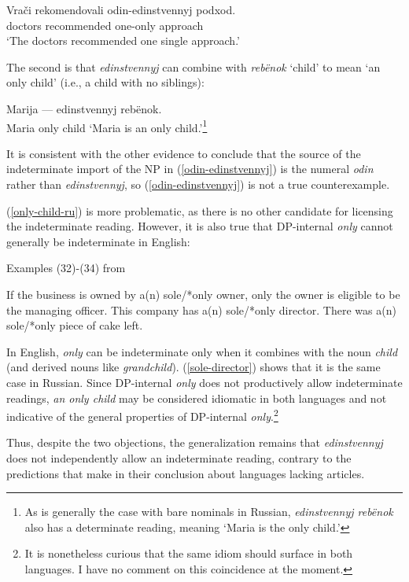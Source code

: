 \begin{exe}
	\ex \label{odin-edinstvennyj} \gll Vra\v{c}i rekomendovali odin-edinstvennyj podxod.\\
	doctors recommended one-only approach\\
	`The doctors recommended one single approach.'
\end{exe}

The second is that \textit{edinstvennyj} can combine with \textit{reb\"{e}nok} `child' to mean `an only child' (i.e., a child with no siblings):

\begin{exe}
	\ex \label{only-child-ru} Marija --- edinstvennyj reb\"{e}nok.\\
	Maria {} only child
	\glt `Maria is an only child.'\footnote{As is generally the case with bare nominals in Russian, \textit{edinstvennyj reb\"{e}nok} also has a determinate reading, meaning `Maria is the only child.'}
\end{exe}

It is consistent with the other evidence to conclude that the source of the indeterminate import of the NP in (\ref{odin-edinstvennyj}) is the numeral \textit{odin} rather than \textit{edinstvennyj}, so (\ref{odin-edinstvennyj}) is not a true counterexample.

(\ref{only-child-ru}) is more problematic, as there is no other candidate for licensing the indeterminate reading. However, it is also true that DP-internal \textit{only} cannot generally be indeterminate in English:


\begin{exe}
	\ex Examples (32)-(34) from \citet{cb2012a} \begin{xlist}
		\ex If the business is owned by a(n) sole/*only owner, only the owner is eligible to be the managing officer.
		\ex This company has a(n) sole/*only director.
		\ex There was a(n) sole/*only piece of cake left.
	\end{xlist}
\end{exe}

In English, \textit{only} can be indeterminate only when it combines with the noun \textit{child} (and derived nouns like \textit{grandchild}). (\ref{sole-director}) shows that it is the same case in Russian. Since DP-internal \textit{only} does not productively allow indeterminate readings, \textit{an only child} may be considered idiomatic in both languages and not indicative of the general properties of DP-internal \textit{only}.\footnote{It is nonetheless curious that the same idiom should surface in both languages. I have no comment on this coincidence at the moment.}

Thus, despite the two objections, the generalization remains that \textit{edinstvennyj} does not independently allow an indeterminate reading, contrary to the predictions that \citet{cb2015} make in their conclusion about languages lacking articles.